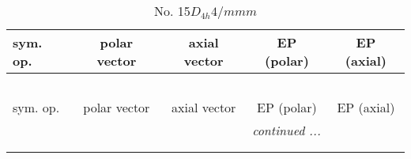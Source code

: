 \documentclass[fleqn,10pt,landscape]{jsarticle}
\begin{document}
\begin{center}
\renewcommand{\arraystretch}{1.3}
\begin{longtable}{lcccc}
\caption{No. 15\quad$D_{4h}$\quad$4/mmm$\quad[ tetragonal ]}
 \\
 \hline \hline
sym. op. & polar vector & axial vector & EP (polar) & EP (axial) \\ \hline \endfirsthead

\multicolumn{4}{l}{\tablename\ \thetable{}} \\
 \hline \hline
sym. op. & polar vector & axial vector & EP (polar) & EP (axial) \\ \hline \endhead

 \hline \hline
\multicolumn{4}{r}{\footnotesize\it continued ...} \\ \endfoot

 \hline \hline
\multicolumn{4}{r}{} \\ \endlastfoot


\end{longtable}
\end{center}
\end{document}
